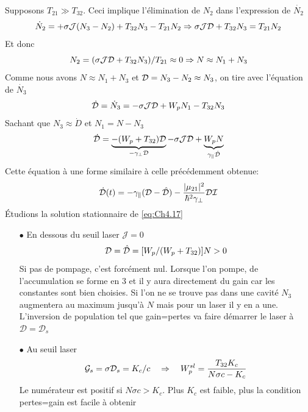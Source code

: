 Supposons $T_{21}\gg T_{32}$. Ceci implique l'élimination de $N_2$ dans l'expression de $\dot{N_2}$
\begin{equation}
{\dot N_2} =  + \sigma {{\cal J}}({N_3} - {N_2}) + {T_{32}}{N_3} - {T_{21}}{N_2}\Rightarrow
\sigma {{\cal J}{\cal D}} + {T_{32}}{N_3} = {T_{21}}{N_2}
\end{equation}
Et donc
\begin{equation}
{N_2} = (\sigma {{\cal J}{\cal D}} + {T_{32}}{N_3})/{T_{21}} \approx 0 \Rightarrow N \approx {N_1} + {N_3}
\end{equation}
Comme nous avons $N \approx {N_1} + {N_3}$ et  ${{\cal D}} = {N_3} - {N_2} \approx {N_3}$, on tire
avec l'équation de $\dot{N_3}$
\begin{equation}
{\dot {\cal D}} = {\dot N_3} =  - \sigma {{\cal J}{\cal D}} + {W_p}{N_1} - {T_{32}}{N_3}
\end{equation}
Sachant que $N_3\approx\dot{D}$ et $N_1=N-N_3$
\begin{equation}
{\dot {\cal D}} =  \underbrace{- ({W_p} + {T_{32}}){{\cal D}}}_{-\gamma_\perp\mathcal{D}} - \sigma {{\cal J}{\cal D}} + \underbrace{{W_p}N}_{\gamma_\parallel\hat{\mathcal{D}}}
\label{eq:Ch4.17}
\end{equation}
Cette équation à une forme similaire à celle précédemment obtenue:
\begin{equation}
\dot {\cal D}(t) =  - {\gamma _\parallel }({{\cal D}} - {\hat {\cal D}}) - \frac{{|{\mu _{21}}{|^2}}}{{{\hbar ^2}{\gamma _ \bot }}}{\cal D}{{\cal I}}
\end{equation}
Étudions la solution stationnaire de \eqref{eq:Ch4.17}
\begin{itemize}
\item[$\bullet$] En dessous du seuil laser $\mathcal{J}=0$
\begin{equation}
{{\cal D}} = {\hat {\cal D}} = [{W_p}/({W_p} + {T_{32}})]N > 0
\end{equation}
Si pas de pompage, c'est forcément nul. Lorsque l'on pompe, de l'accumulation se 
forme en 3 et il y aura directement du gain car les constantes sont bien choisies. Si l'on ne se 
trouve pas dans une cavité $N_3$ augmentera au maximum jusqu'à $N$ mais pour un laser il y en a une. 
L'inversion de population tel que gain=pertes  va faire démarrer le laser à $\mathcal{D}=\mathcal{D}_s$
\item[$\bullet$] Au seuil laser
\begin{equation}
{{{\cal G}}_s} = \sigma {{{\cal D}}_s} = {K_c}/c\quad\Rightarrow\quad 
W_p^{sl} = \frac{{{T_{32}}{K_c}}}{{N\sigma c - {K_c}}}
\end{equation}
Le numérateur est positif si $N\sigma c>K_c$. Plus $K_c$ est faible, plus la condition pertes=gain 
est facile à obtenir
\end{itemize}
